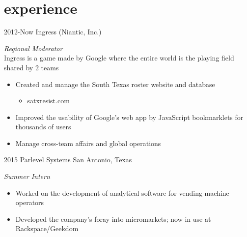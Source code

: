 \documentclass[]{friggeri-cv} %
\begin{document}

\vspace{-.5pt}

\section{experience}


\begin{entrylist}

	\entry
	{2012-Now}
	{Ingress (Niantic, Inc.)}
	{}
	{\emph{Regional Moderator} \\
		Ingress is a game made by Google where the entire world is the playing field shared by 2 teams
		\begin{itemize}
			\item Created and manage the South Texas roster website and database
				\begin{itemize}
					\item \href{http://satxresist.com}{satxresist.com}
				\end{itemize}
			\item Improved the usability of Google's web app by JavaScript bookmarklets for thousands of users
			\item Manage cross-team affairs and global operations
		\end{itemize}
	}


	\entry
	{2015}
	{Parlevel Systems}
	{San Antonio, Texas}
	{\emph{Summer Intern}
		\begin{itemize}
			\item Worked on the development of analytical software for vending machine operators
			\item Developed the company's foray into micromarkets; now in use at Rackspace/Geekdom
		\end{itemize}
	}

\end{entrylist}

\vspace{-.5pt}
\end{document}

